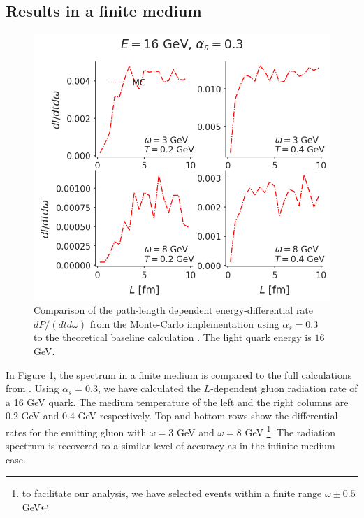 \documentclass[aps, prc, reprint, amsmath, groupedaddress, nofootinbib]{revtex4-1}
\begin{document}
\subsection{Results in a finite medium}
\begin{figure}
\includegraphics[width=\columnwidth]{spectrum_L.png}
\caption{Comparison of the path-length dependent energy-differential rate $dP/(dtd\omega)$ from the Monte-Carlo implementation using $\alpha_s = 0.3$ to the theoretical baseline calculation \cite{CaronHuot:2010bp}. The light quark energy is $16$ GeV.}
\label{fig:spectra-L-alphas=0.3}
\end{figure}

In Figure \ref{fig:spectra-L-alphas=0.3}, the spectrum in a finite medium is compared to the full calculations from \cite{CaronHuot:2010bp}.
Using $\alpha_s = 0.3$, we have calculated the $L$-dependent gluon radiation rate of a 16 GeV quark.
The medium temperature of the left and the right columns are 0.2 GeV and 0.4 GeV respectively.
Top and bottom rows show the differential rates for the emitting gluon with $\omega = 3$ GeV and $\omega = 8$ GeV \footnote{to facilitate our analysis, we have selected events within a finite range $\omega\pm 0.5$ GeV}.
The radiation spectrum is recovered to a similar level of accuracy as in the infinite medium case.
\end{document}
